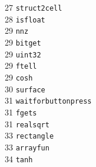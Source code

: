 \begin{footnotesize}
\begin{multicols}{3}
\vspace{-.153cm} 27    \hspace{.2cm} {\tt struct2cell         }    \\ %
\vspace{-.153cm} 28    \hspace{.2cm} {\tt isfloat             }    \\ %
\vspace{-.153cm} 29    \hspace{.2cm} {\tt nnz                 }    \\ %
\vspace{-.153cm} 29    \hspace{.2cm} {\tt bitget              }    \\ %
\vspace{-.153cm} 29    \hspace{.2cm} {\tt uint32              }    \\ %
\vspace{-.153cm} 29    \hspace{.2cm} {\tt ftell               }    \\ %
\vspace{-.153cm} 29    \hspace{.2cm} {\tt cosh                }    \\ %
\vspace{-.153cm} 30    \hspace{.2cm} {\tt surface             }    \\ %
\vspace{-.153cm} 31    \hspace{.2cm} {\tt waitforbuttonpress  }    \\ %
\vspace{-.153cm} 31    \hspace{.2cm} {\tt fgets               }    \\ %
\vspace{-.153cm} 31    \hspace{.2cm} {\tt realsqrt            }    \\ %
\vspace{-.153cm} 33    \hspace{.2cm} {\tt rectangle           }    \\ %
\vspace{-.153cm} 33    \hspace{.2cm} {\tt arrayfun            }    \\ %
\vspace{-.153cm} 34    \hspace{.2cm} {\tt tanh                }    \\ %

\end{multicols}
\end{footnotesize}
